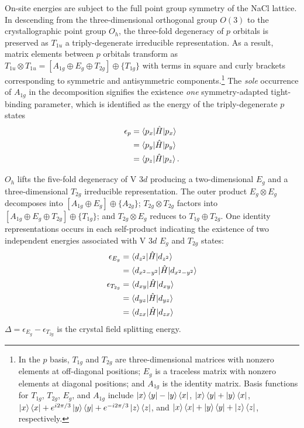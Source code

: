 \documentclass[twocolumn,showpacs,preprintnumbers,superscriptaddress,prb,floatfix,aps,10pt]{revtex4-1}
\newcommand*{\ham}{\hat{H}}
\begin{document}
On-site energies are subject to the full point group symmetry of the NaCl lattice. In descending from the three-dimensional orthogonal group $O(3)$ to the crystallographic point group $O_h$, the three-fold degeneracy of $p$ orbitals is preserved as $T_{1u}$ a triply-degenerate irreducible representation. As a result, matrix elements between $p$ orbitals transform as $T_{1u} \otimes T_{1u} = [A_{1g} \oplus E_g \oplus T_{2g}] \oplus \{T_{1g}\}$ with terms in square and curly brackets corresponding to symmetric and antisymmetric components.\footnote{In the $p$ basis, $T_{1g}$ and $T_{2g}$ are three-dimensional matrices with nonzero elements at off-diagonal positions; $E_g$ is a traceless matrix with nonzero elements at diagonal positions; and $A_{1g}$ is the identity matrix. Basis functions for $T_{1g}$, $T_{2g}$, $E_g$, and $A_{1g}$ include $\ket{x}\bra{y} - \ket{y}\bra{x}$, $\ket{x}\bra{y} + \ket{y}\bra{x}$, $\ket{x}\bra{x} + e^{i2\pi/3}\ket{y}\bra{y} + e^{-i2\pi/3}\ket{z}\bra{z}$, and $\ket{x}\bra{x} + \ket{y}\bra{y} + \ket{z}\bra{z}$, respectively.} The \emph{sole} occurrence of $A_{1g}$ in the decomposition signifies the existence \emph{one} symmetry-adapted tight-binding parameter, which is identified as the energy of the triply-degenerate $p$ states
%
\begin{align}
\epsilon_{p}
&= \braket{p_x | \ham | p_x} \\
&= \braket{p_y | \ham | p_y} \\
&= \braket{p_z | \ham | p_z}.
\end{align}
%

$O_h$ lifts the five-fold degeneracy of V 3$d$ producing a two-dimensional $E_g$ and a three-dimensional $T_{2g}$ irreducible representation. The outer product $E_g \otimes E_g$ decomposes into $[A_{1g} \oplus E_g] \oplus \{A_{2g}\}$; $T_{2g} \otimes T_{2g}$ factors into $[A_{1g} \oplus E_{g} \oplus T_{2g}] \oplus \{T_{1g}\}$; and $T_{2g} \otimes E_g$ reduces to $T_{1g} \oplus T_{2g}$. One identity representations occurs in each self-product indicating the existence of two independent energies associated with V 3$d$ $E_g$ and $T_{2g}$ states:
\begin{align}
\epsilon_{E_g}
&= \braket{d_{z^2}      | \ham | d_{z^2}} \\
&= \braket{d_{x^2-y^2}  | \ham | d_{x^2-y^2}  } \\
\epsilon_{T_{2g}}
&= \braket{d_{xy} | \ham | d_{xy} } \\
&= \braket{d_{yz} | \ham | d_{yz} } \\
&= \braket{d_{zx} | \ham | d_{zx} }
\end{align}
$\Delta = \epsilon_{E_g} - \epsilon_{T_{2g}}$ is the crystal field splitting energy. 
\end{document}

